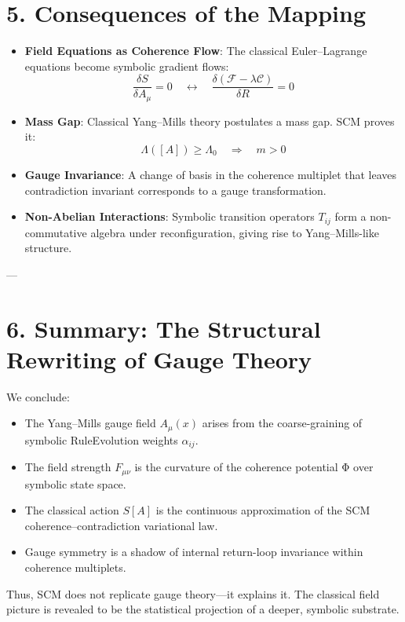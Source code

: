 \section{5. Consequences of the Mapping} \label{sec:gauge-implications}

\begin{itemize}
  \item \textbf{Field Equations as Coherence Flow}: The classical Euler–Lagrange equations become symbolic gradient flows:
  \[
  \frac{\delta S}{\delta A_\mu} = 0 \quad \leftrightarrow \quad \frac{\delta (\mathcal{F} - \lambda \mathcal{C})}{\delta R} = 0
  \]
  
  \item \textbf{Mass Gap}: Classical Yang–Mills theory postulates a mass gap. SCM proves it:
  \[
  \Lambda([A]) \geq \Lambda_0 \quad \Rightarrow \quad m > 0
  \]
  
  \item \textbf{Gauge Invariance}: A change of basis in the coherence multiplet that leaves contradiction invariant corresponds to a gauge transformation.

  \item \textbf{Non-Abelian Interactions}: Symbolic transition operators $T_{ij}$ form a non-commutative algebra under reconfiguration, giving rise to Yang–Mills-like structure.
\end{itemize}

---

\section{6. Summary: The Structural Rewriting of Gauge Theory} \label{sec:gauge-summary}

We conclude:

\begin{itemize}
  \item The Yang–Mills gauge field $A_\mu(x)$ arises from the coarse-graining of symbolic RuleEvolution weights $\alpha_{ij}$.
  \item The field strength $F_{\mu\nu}$ is the curvature of the coherence potential Φ over symbolic state space.
  \item The classical action $S[A]$ is the continuous approximation of the SCM coherence–contradiction variational law.
  \item Gauge symmetry is a shadow of internal return-loop invariance within coherence multiplets.
\end{itemize}

Thus, SCM does not replicate gauge theory—it explains it. The classical field picture is revealed to be the statistical projection of a deeper, symbolic substrate.

